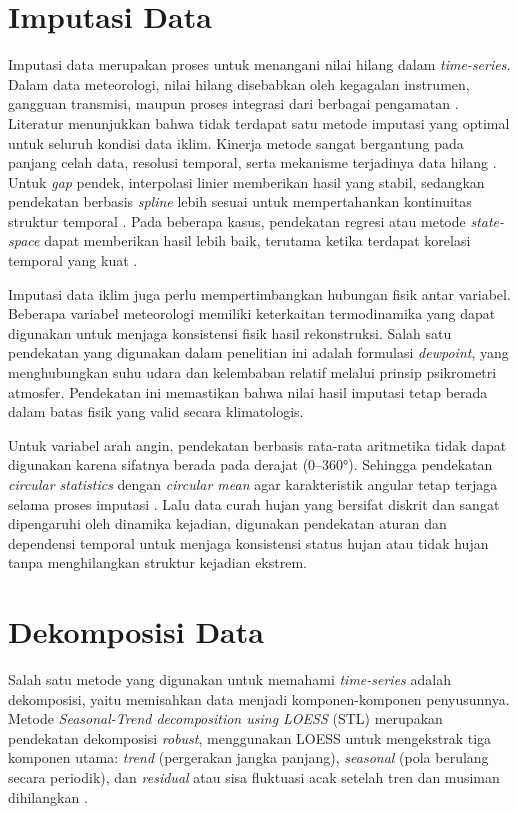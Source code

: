 \section{Imputasi Data}
Imputasi data merupakan proses untuk menangani nilai hilang dalam \textit{time-series}. Dalam data meteorologi, nilai hilang disebabkan oleh kegagalan instrumen, gangguan transmisi, maupun proses integrasi dari berbagai pengamatan \citep{faybishenko2022}. Literatur menunjukkan bahwa tidak terdapat satu metode imputasi yang optimal untuk seluruh kondisi data iklim. Kinerja metode sangat bergantung pada panjang celah data, resolusi temporal, serta mekanisme terjadinya data hilang \citep{alejo2025}. Untuk \textit{gap} pendek, interpolasi linier memberikan hasil yang stabil, sedangkan pendekatan berbasis \textit{spline} lebih sesuai untuk mempertahankan kontinuitas struktur temporal \citep{cerlini2020}. Pada beberapa kasus, pendekatan regresi atau metode \textit{state-space} dapat memberikan hasil lebih baik, terutama ketika terdapat korelasi temporal yang kuat \citep{afrifa2020}.

Imputasi data iklim juga perlu mempertimbangkan hubungan fisik antar variabel. Beberapa variabel meteorologi memiliki keterkaitan termodinamika yang dapat digunakan untuk menjaga konsistensi fisik hasil rekonstruksi. Salah satu pendekatan yang digunakan dalam penelitian ini adalah formulasi \textit{dewpoint}, yang menghubungkan suhu udara dan kelembaban relatif melalui prinsip psikrometri atmosfer. Pendekatan ini memastikan bahwa nilai hasil imputasi tetap berada dalam batas fisik yang valid secara klimatologis.

Untuk variabel arah angin, pendekatan berbasis rata-rata aritmetika tidak dapat digunakan karena sifatnya berada pada derajat (0–360°). Sehingga pendekatan \textit{circular statistics} dengan \textit{circular mean} agar karakteristik angular tetap terjaga selama proses imputasi \citep{li2023}. Lalu data curah hujan yang bersifat diskrit dan sangat dipengaruhi oleh dinamika kejadian, digunakan pendekatan aturan dan dependensi temporal untuk menjaga konsistensi status hujan atau tidak hujan tanpa menghilangkan struktur kejadian ekstrem.

\section{Dekomposisi Data}
Salah satu metode yang digunakan untuk memahami \textit{time-series} adalah dekomposisi, yaitu memisahkan data menjadi komponen-komponen penyusunnya. Metode \textit{Seasonal-Trend decomposition using LOESS} (STL) merupakan pendekatan dekomposisi \textit{robust}, menggunakan LOESS untuk mengekstrak tiga komponen utama: \textit{trend} (pergerakan jangka panjang), \textit{seasonal} (pola berulang secara periodik), dan \textit{residual} atau sisa fluktuasi acak setelah tren dan musiman dihilangkan \citep{lem2024}.

